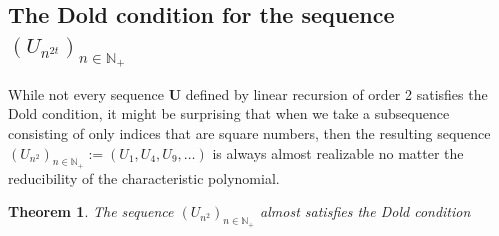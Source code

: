 \documentclass[preprint,12pt]{elsarticle}
\newcommand{\N}{\mathbb{N}}
\newtheorem{theorem}{Theorem}
\begin{document}
\subsection{The Dold condition for the sequence  $(U_{n^{2t}})_{n\in\N_+}$}

While not every sequence ${\mathbf U}$ defined by linear recursion of order 2 satisfies the Dold condition, it might be surprising that when we take a subsequence consisting of only indices that are square numbers, then the resulting sequence $(U_{n^2})_{n\in\N_+} := (U_1,  U_4,  U_9, \ldots)$ is always almost realizable no matter the reducibility of the characteristic polynomial.
\begin{theorem}\label{theor_n2}
    The sequence $(U_{n^2})_{n\in\N_+}$ almost satisfies the Dold condition
\end{theorem}
\end{document}
